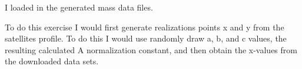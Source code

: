 
I loaded in the generated mass data files.

To do this exercise I would first generate realizations points x and y from the satellites profile. To do this I would use randomly draw a, b, and c values, the resulting calculated A normalization constant, and then obtain the x-values from the downloaded data sets.





